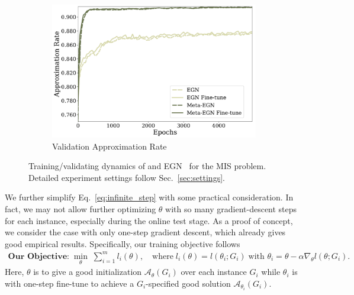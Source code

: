 \begin{figure}[t]
\begin{subfigure}[c]{0.32\textwidth}
         \centering
         \includegraphics[width=\textwidth]{iclr2023/img/method/val_apr.pdf}
         \vspace{-0.6cm}
         \caption{Validation Approximation Rate }
         \label{fig:dynamic_3}
     \end{subfigure}
     \vspace{-0.2cm}
        \caption{Training/validating dynamics of \proj and EGN~\cite{karalias2020erdos} for the MIS problem.   Detailed experiment settings follow Sec.~\ref{sec:settings}.}
        \vspace{-0.2cm}%
        \label{fig:dynamic}
\end{figure}



We further simplify Eq.~\ref{eq:infinite_step} with some practical consideration. In fact, we may not allow further optimizing $\theta$ with so many gradient-descent steps for each instance, especially during the online test stage. As a proof of concept, we consider the case with only one-step gradient descent, which already gives good empirical results. Specifically, our training objective  follows
\begin{equation}
\label{eq:actual}
\begin{aligned}
\textbf{Our Objective:} \;\min_{\theta} \;\sum_{i=1}^m l_i(\theta), \quad \text{where}\; l_i(\theta) = l(\theta_i;G_i) \;\text{with $\theta_i=\theta -\alpha \nabla_\theta l(\theta;G_i)$.}
\end{aligned}
\end{equation}
Here, $\theta$ is to give a good initialization $\mathcal{A}_{\theta}(G_i)$ over each instance $G_i$ while $\theta_i$ is with one-step fine-tune to achieve a $G_i$-specified good solution $\mathcal{A}_{\theta_i}(G_i)$. 

